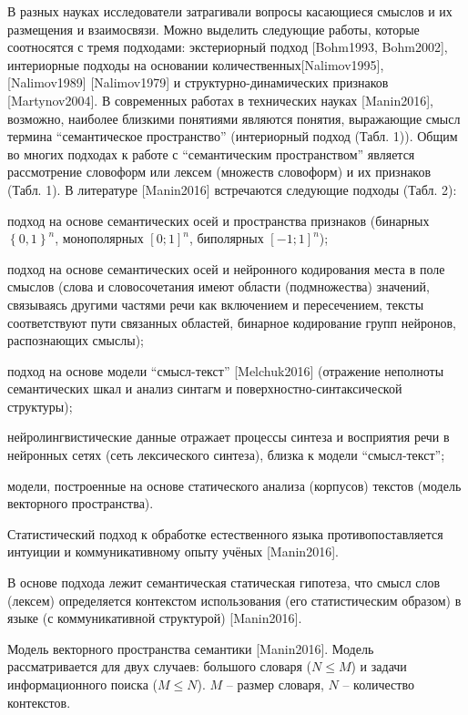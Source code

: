 В разных науках исследователи затрагивали вопросы касающиеся смыслов и их размещения и взаимосвязи. Можно выделить следующие работы, которые соотносятся с тремя подходами: экстериорный подход [Bohm1993, Bohm2002], интериорные подходы на основании количественных[Nalimov1995], [Nalimov1989] [Nalimov1979] и структурно-динамических признаков [Martynov2004].
В современных работах в технических науках [Manin2016], возможно, наиболее близкими понятиями являются понятия, выражающие смысл термина ``семантическое пространство'' (интериорный подход (Табл. 1)).
Общим во многих подходах к работе с ``семантическим пространством'' является рассмотрение словоформ или лексем (множеств словоформ) и их признаков (Табл. 1). В литературе [Manin2016] встречаются следующие подходы (Табл. 2):
\begin{textitemize}
	\item подход на основе семантических осей и пространства признаков (бинарных $\left\lbrace 0,1\right\rbrace ^{n}$, монополярных $\left[0;1\right]^{n}$, биполярных $\left[-1;1\right]^{n}$);
	\item подход на основе семантических осей и нейронного кодирования места в поле смыслов (слова и словосочетания имеют области (подмножества) значений, связываясь другими частями речи как включением и пересечением, тексты соответствуют пути связанных областей, бинарное кодирование групп нейронов, распознающих смыслы);
	\item подход на основе модели ``смысл-текст'' [Melchuk2016] (отражение неполноты семантических шкал и анализ синтагм и поверхностно-синтаксической структуры);
	\item нейролингвистические данные отражает процессы синтеза и восприятия речи в нейронных сетях (сеть лексического синтеза), близка к модели ``смысл‑текст'';
	\item модели, построенные на основе статического анализа (корпусов) текстов (модель векторного пространства).
\end{textitemize}
Статистический подход к обработке естественного языка противопоставляется интуиции и коммуникативному опыту учёных [Manin2016].

В основе подхода лежит семантическая статическая гипотеза, что смысл слов (лексем) определяется контекстом использования (его статистическим образом) в языке (с коммуникативной структурой) [Manin2016].

Модель векторного пространства семантики [Manin2016]. Модель рассматривается для двух случаев: большого словаря ($N\leq{M}$) и задачи информационного поиска ($M\leq{N}$). $M$ -- размер словаря, $N$ -- количество контекстов.

